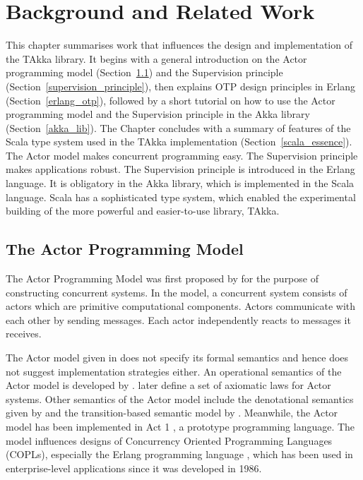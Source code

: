 \chapter{Background and Related Work}
\label{background}

This chapter summarises work that influences the design and implementation of 
the TAkka library.  It begins with a general introduction on the 
Actor programming model (Section~\ref{actor_general}) and the Supervision principle
(Section~\ref{supervision_principle}), then explains OTP design 
principles in Erlang (Section~\ref{erlang_otp}), followed by a short tutorial on how to use the Actor 
programming model and the Supervision principle in the Akka library (Section~\ref{akka_lib}).  The 
Chapter concludes with a summary of features of the Scala type system used in the TAkka 
implementation (Section~\ref{scala_essence}).  The Actor model makes concurrent programming easy.  The 
Supervision principle makes applications robust.  The Supervision principle is 
introduced in the Erlang language.  It is obligatory in the Akka library, 
which is implemented in the Scala language.  Scala has a sophisticated type 
system, which enabled the experimental building of the more powerful and 
easier-to-use library, TAkka.


\section{The Actor Programming Model}
\label{actor_general}

The Actor Programming Model was first proposed by \citet{Hewitt:1973} for the 
purpose of constructing concurrent systems.  In the model, a concurrent system
consists of actors which are primitive computational components. Actors 
communicate with each other by sending messages.  Each actor independently 
reacts to messages it receives.

The Actor model given in \citep{Hewitt:1973} does not specify its formal 
semantics and hence does not suggest implementation strategies either.  An 
operational semantics of the Actor model is developed by 
\citet{actor_operational_semantics}.  \citet{acot_laws} later define a set of 
axiomatic laws for Actor systems.  Other semantics of the Actor model include 
the denotational semantics given by \citet{actor_denotational_semantics} and 
the transition-based semantic model by \citet{actor_transition_semantic}.
Meanwhile, the Actor model has been implemented in Act 1 \citep{Act1}, a 
prototype programming language.  The model influences designs of 
Concurrency Oriented Programming Languages (COPLs), especially the Erlang 
programming language \citep{ArmstrongErlang}, which has been used in 
enterprise-level applications since it was developed in 1986.
  
